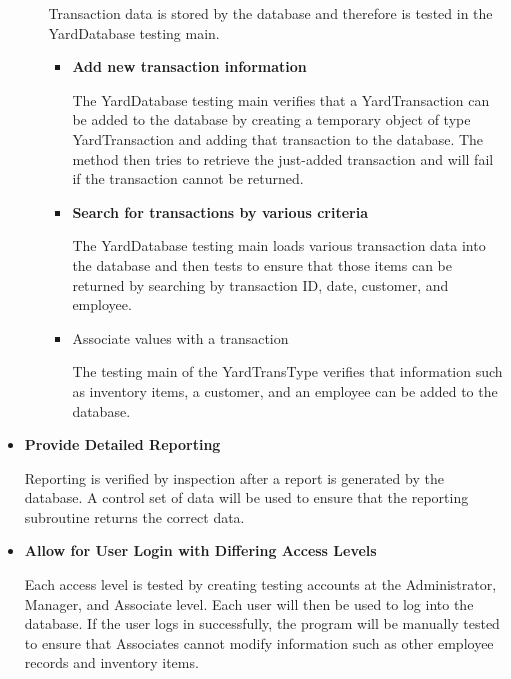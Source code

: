 \documentclass{report}
\begin{document}
\begin{itemize}
\begin{itemize}
			Transaction data is stored by the database and therefore is tested in the YardDatabase testing main.
                \begin{itemize}
                    \item{\textbf{Add new transaction information}}

		    	The YardDatabase testing main verifies that a YardTransaction can be added to the database by
			creating a temporary object of type YardTransaction and adding that transaction to the database.  The
			method then tries to retrieve the just-added transaction and will fail if the transaction cannot be returned.

                    \item{\textbf{Search for transactions by various criteria}}

			The YardDatabase testing main loads various transaction data into the database and then tests to
			ensure that those items can be returned by searching by transaction ID, date, customer, and employee.

                    \item{Associate values with a transaction}

		    	The testing main of the YardTransType verifies that information such as inventory items, a customer, and 			an employee can be added to the database.
                \end{itemize}
            \end{itemize}
            \item{\textbf{Provide Detailed Reporting}}

	    	Reporting is verified by inspection after a report is generated by the database.  A control set of data will be
		used to ensure that the reporting subroutine returns the correct data.
	      \item{\textbf{Allow for User Login with Differing Access Levels}}

	      	Each access level is tested by creating testing accounts at the Administrator, Manager, and Associate
		level.  Each user will then be used to log into the database.  If the user logs in successfully, the program will
		be manually tested to ensure that Associates cannot modify information such as other employee records and
		inventory items.
	\end{itemize}
\end{document}
